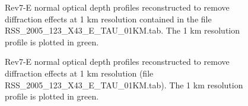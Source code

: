 \documentclass[crop=false,class=book]{standalone}
\begin{document}
\begin{figure}[H]
    \centering
    \caption[Normal Optical Depth Profiles 100000-115000km]{Rev7-E normal optical depth profiles reconstructed to remove diffraction effects at 1 km resolution contained in the file RSS\_2005\_123\_X43\_E\_TAU\_01KM.tab. The 1 km resolution profile is plotted in green.}
\end{figure}
\begin{figure}[H]
    \centering
    \caption[Normal Optical Depth Profiles 115000-130000km]{Rev7-E normal optical depth profiles reconstructed to remove diffraction effects at 1 km resolution (file RSS\_2005\_123\_X43\_E\_TAU\_01KM.tab). The 1 km resolution profile is plotted in green.}
\end{figure}
\end{document}
